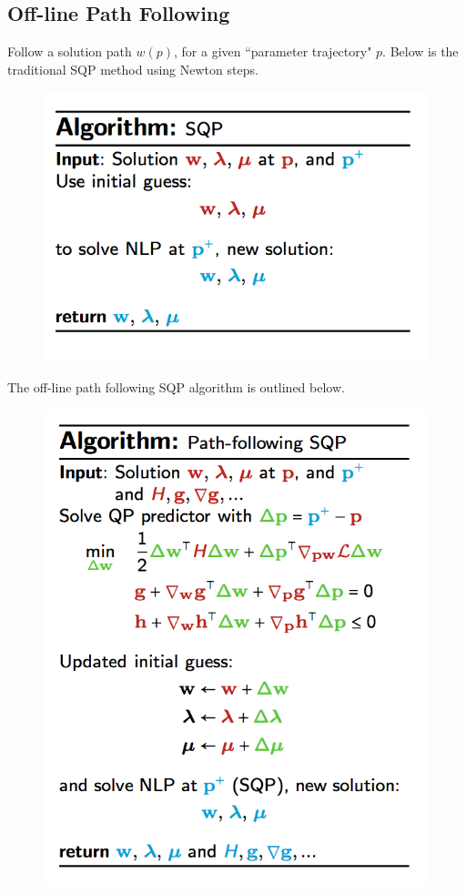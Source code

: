 \documentclass{article}
\theoremstyle{example}
\theoremstyle{definition}
\theoremstyle{assumption}
\theoremstyle{lemma}
\begin{document}
	\subsection{Off-line Path Following}
	Follow a solution path $w(p)$, for a given ``parameter trajectory" $p$. Below is the traditional SQP method using Newton steps.
	\begin{figure}[H]
		\centering
		\includegraphics{NLP_SQP}
	\end{figure}
	The off-line path following SQP algorithm is outlined below.
	\begin{figure}[H]
		\centering
		\includegraphics{SQP_path}
	\end{figure}
\end{document}
